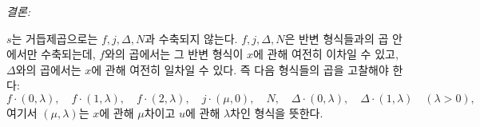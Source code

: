 
\noindent\emph{결론:}

$s$는 거듭제곱으로는 $f,j,\Delta,N$과 수축되지 않는다. $f,j,\Delta,N$은 반변 형식들과의 곱 안에서만 수축되는데, $f$와의 곱에서는 그 반변 형식이 $x$에 관해 여전히 이차일 수 있고, $\Delta$와의 곱에서는 $x$에 관해 여전히 일차일 수 있다. 즉 다음 형식들의 곱을 고찰해야 한다:
\[
 f\cdot(0,\lambda),\quad f\cdot(1,\lambda),\quad f\cdot(2,\lambda),\quad
 j\cdot(\mu,0),\quad N,\quad
 \Delta\cdot(0,\lambda),\quad \Delta\cdot(1,\lambda)\quad(\lambda>0),
\]
여기서 $(\mu,\lambda)$는 $x$에 관해 $\mu$차이고 $u$에 관해 $\lambda$차인 형식을 뜻한다.

